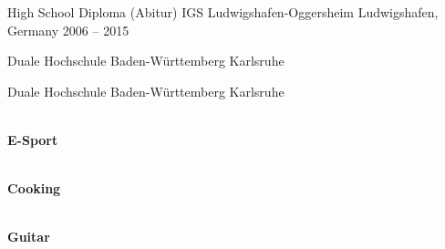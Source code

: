 \documentclass[10pt, a4paper]{cvhari}
\begin{document}
    \education
    {High School Diploma (Abitur)}
    {IGS Ludwigshafen-Oggersheim}
    {Ludwigshafen, Germany}
    {2006 -- 2015}

    \par
    \dividergray
\medskip

    \bigskip
    
    {Duale Hochschule Baden-Württemberg Karlsruhe}\par
    
    \smallskip 
    \dividergray
    \smallskip
    
    {Duale Hochschule Baden-Württemberg Karlsruhe}\par
    \medskip

\medskip

    \bigskip

    \begin{center}
        \begin{minipage}{0.18\textwidth}
            \centering
            \faGamepad\\
            \textbf{E-Sport}
        \end{minipage}
        \hfill
        \hfill
        \begin{minipage}{0.18\textwidth}
            \centering
            \faCutlery\\
            \textbf{Cooking}
        \end{minipage}
        \hfill
        \hfill
        \begin{minipage}{0.18\textwidth}
            \centering
            \faMusic\\
            \textbf{Guitar}
        \end{minipage}
    \end{center}
    
\end{document}
